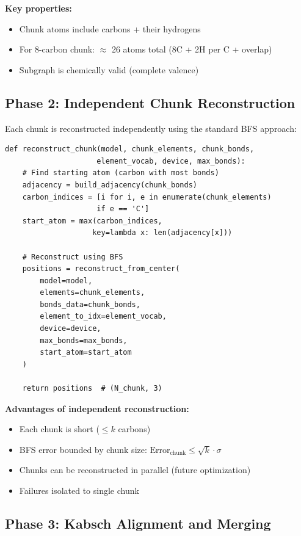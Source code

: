 \documentclass[11pt,a4paper]{article}
\begin{document}
\textbf{Key properties:}
\begin{itemize}
    \item Chunk atoms include carbons + their hydrogens
    \item For 8-carbon chunk: $\approx$ 26 atoms total (8C + 2H per C + overlap)
    \item Subgraph is chemically valid (complete valence)
\end{itemize}

\subsection{Phase 2: Independent Chunk Reconstruction}

Each chunk is reconstructed independently using the standard BFS approach:

\begin{lstlisting}[caption={Chunk Reconstruction}]
def reconstruct_chunk(model, chunk_elements, chunk_bonds,
                     element_vocab, device, max_bonds):
    # Find starting atom (carbon with most bonds)
    adjacency = build_adjacency(chunk_bonds)
    carbon_indices = [i for i, e in enumerate(chunk_elements)
                     if e == 'C']
    start_atom = max(carbon_indices,
                    key=lambda x: len(adjacency[x]))

    # Reconstruct using BFS
    positions = reconstruct_from_center(
        model=model,
        elements=chunk_elements,
        bonds_data=chunk_bonds,
        element_to_idx=element_vocab,
        device=device,
        max_bonds=max_bonds,
        start_atom=start_atom
    )

    return positions  # (N_chunk, 3)
\end{lstlisting}

\textbf{Advantages of independent reconstruction:}
\begin{itemize}
    \item Each chunk is short ($\leq k$ carbons)
    \item BFS error bounded by chunk size: $\text{Error}_{\text{chunk}} \leq \sqrt{k} \cdot \sigma$
    \item Chunks can be reconstructed in parallel (future optimization)
    \item Failures isolated to single chunk
\end{itemize}

\subsection{Phase 3: Kabsch Alignment and Merging}
\end{document}
